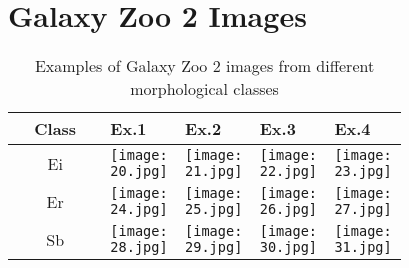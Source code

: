 \chapter{Galaxy Zoo 2 Images}

\begin{table}[h] %
    \centering
    \begin{tabular}{cM{0.195\linewidth}M{0.195\linewidth}M{0.195\linewidth}M{0.195\linewidth}}
       \toprule
        Class & Ex.1 & Ex.2 & Ex.3 & Ex.4 \\
        \midrule
        Ei & \texttt{[image: 20.jpg]} & \texttt{[image: 21.jpg]} & \texttt{[image: 22.jpg]} & \texttt{[image: 23.jpg]} \\
        Er & \texttt{[image: 24.jpg]} & \texttt{[image: 25.jpg]} & \texttt{[image: 26.jpg]} & \texttt{[image: 27.jpg]} \\
        Sb & \texttt{[image: 28.jpg]} & \texttt{[image: 29.jpg]} & \texttt{[image: 30.jpg]} & \texttt{[image: 31.jpg]} \\
        \bottomrule
    \end{tabular}
    \caption[Galaxy Zoo 2 sample images]{Examples of Galaxy Zoo 2 images from different morphological classes}
    \label{tab:sample-images}
\end{table}
